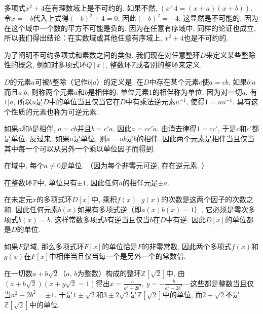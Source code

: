多项式$x^2+4$在有理数域上是不可约的. 如果不然, $(x^+4 = (x+a)(x+b))$. 令$x=-b$代入上式得$(-b)^2+4 = 0$, 因此$(-b)^2=-4$, 这显然是不可能的, 因为在这个域中一个数的平方不可能是负的. 因为在任意有序域中, 同样的论证也成立, 所以我们得出结论：在实数域或其他任意有序域上, $x^2+4$也是不可约的. 

为了阐明不可约多项式和素数之间的类似, 我们现在对任意整环$D$来定义某些整除性的概念, 例如对多项式环$Q[x]$, 整数环$\mathbb{Z}$或者别的整环来定义. 

$D$的元素$a$可被$b$整除（记作$b|a$）的定义是, 在$D$中存在某个元素$c$使$a = cb$. 如果$b|a$而且$a|b$, 则称两个元素$a$和$b$是相伴的. 单位元素1的相伴称为单位. 因为对一切$a$, 有$1|a$, 所以$u$是$D$中的单位当且仅当它在$D$中有乘法逆元素$u^{-1}$, 使得$1=uu^{-1}$. 具有这个性质的元素也称为可逆元素. 

如果$a$和$b$是相伴, $a=cb$并且$b=c'a$, 因此$a=cc'a$. 由消去律得$1=cc'$, 于是$c$和$c'$都是单位. 反过来, 如果$u$是单位, 则$a=ub$是$b$的相伴. 因此两个元素是相伴当且仅当其中每一个可以从另外一个乘以单位因子而得到. 

\begin{example}\label{exam001030601}
在域中, 每个$a \neq 0$是单位. （因为每个非零元可逆, 存在逆元素. ）
\end{example}

\begin{example}\label{exam001030602}
在整数环$\mathbb{Z}$中, 单位只有$\pm{1}$, 因此任何$a$的相伴元是$\pm{a}$. 
\end{example}

\begin{example}\label{exam001030603}
在未定元$x$的多项式环$D[x]$中, 乘积$f(x) \cdot g(x)$的次数是这两个因子的次数之和. 因此任何元素$b(x)$如果有多项式逆（即$a(x)b(x)=1$）, 它必须是零次多项式$b(x)=b$. 这样常数多项式$b$有逆当且仅当$b$在$D$中有逆. 因此$D[x]$的单位都是$D$的单位. 

如果$F$是域, 那么多项式环$F[x]$的单位恰是$F$的非零常数, 因此两个多项式$f(x)$和$g(x)$在$F[x]$中相伴当且仅当每一个是另外一个的常数倍. 
\end{example}

\begin{example}\label{exam001030604}
在一切数$a + b\sqrt{2}$（$a$, $b$为整数）构成的整环$\mathbb{Z}[\sqrt{2}]$中, 由$(a+b\sqrt{2})(x+y\sqrt{2}=1)$得出$x = \frac{a}{a^2-2b^2}$, $y = -\frac{b}{a^2-2b^2}$---这些都是整数当且仅当$a^2-2b^2=\pm{1}$. 于是$1\pm{}\sqrt{2}$和$3 \pm 2\sqrt{2}$是$\mathbb{Z}[\sqrt{2}]$中的单位, 而$2 + \sqrt{2}$不是$\mathbb{Z}[\sqrt{2}]$中的单位. 
\end{example}

